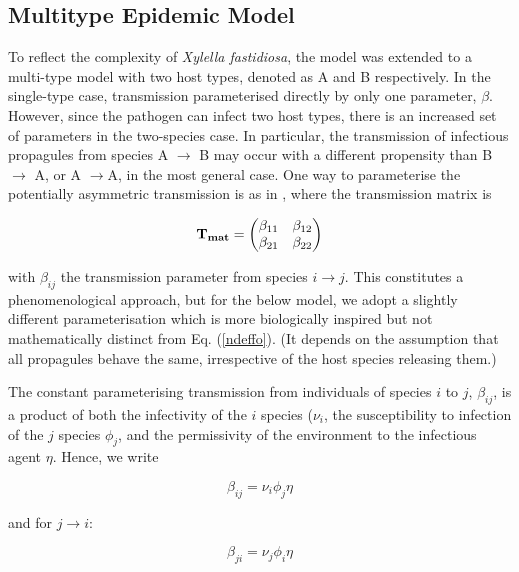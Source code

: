 \documentclass[prstpaper]{revtex4-2}
\begin{document}
\subsection*{Multitype Epidemic Model}

To reflect the complexity of \emph{Xylella fastidiosa}, the model was extended to a multi-type model with two host types, denoted as A and B respectively. In the single-type case, transmission parameterised directly by only one parameter, $\beta$. However, since the pathogen can infect two host types, there is an increased set of parameters in the two-species case. In particular, the transmission of infectious propagules from species A $\rightarrow$ B may occur with a different propensity than B $\rightarrow$ A, or A $\rightarrow $A, in the most general case. One way to parameterise the potentially asymmetric transmission is as in \cite{NdeffoMbah2010}, where the transmission matrix is 

\begin{equation}
\label{ndeffo}
\bf{T_{mat}} = 
\begin{pmatrix}
\beta_{11} & \beta_{12} \\
\beta_{21} & \beta_{22}
\end{pmatrix} 
\end{equation}

with $\beta_{ij}$ the transmission parameter from species $i \rightarrow j$. This constitutes a phenomenological approach, but for the below model, we adopt a slightly different parameterisation which is more biologically inspired but not mathematically distinct from Eq. (\ref{ndeffo}). (It depends on the assumption that all propagules behave the same, irrespective of the host species releasing them.) 

The constant parameterising transmission from individuals of species $i$ to $j$, $\beta_{ij}$, is a product of both the infectivity of the $i$ species ($\nu_{i}$, the susceptibility to infection of the $j$ species $\phi_{j}$, and the permissivity of the environment to the infectious agent $\eta$. Hence, we write

\begin{equation}
\beta_{ij} = \nu_{i} \phi_{j} \eta
\end{equation}

and for $j \rightarrow i$:

\begin{equation}
\beta_{ji}= \nu_{j} \phi_{i} \eta
\end{equation}
\end{document}

